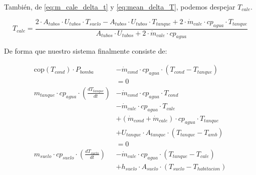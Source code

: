 También, de \eqref{eq:m_cale_delta_t} y \eqref{eq:mean_delta_T}, podemos despejar $T_{cale}$.

\begin{equation} \label{eq:t_cale}
	T_{cale} = \frac{2 \cdot A_{tubos} \cdot U_{tubos} \cdot T_{suelo} - A_{tubos} \cdot U_{tubos} \cdot T_{tanque} + 2 \cdot \dot{m}_{cale} \cdot cp_{agua} \cdot T_{tanque}}{A_{tubos} \cdot U_{tubos} + 2 \cdot \dot{m}_{cale} \cdot cp_{agua}}
\end{equation}

De forma que nuestro sistema finalmente consiste de:

\begin{align}
	\text{cop}(T_{cond}) \cdot P_{bomba}                                     & - \dot{m}_{cond} \cdot cp_{agua} \cdot \left(T_{cond} - T_{tanque}\right) \nonumber                  \\
	                                                                         & = 0 \label{eq:sys_1}                                                                                 \\
	m_{tanque} \cdot cp_{agua} \cdot \left( \frac{dT_{tanque}}{dt} \right)   & - \dot{m}_{cond} \cdot cp_{agua} \cdot T_{cond} \nonumber                                            \\
	                                                                         & - \dot{m}_{cale} \cdot cp_{agua} \cdot T_{cale} \nonumber                                            \\
	                                                                         & + (\dot{m}_{cond} + \dot{m}_{cale}) \cdot cp_{agua} \cdot T_{tanque} \nonumber                       \\
	                                                                         & + U_{tanque} \cdot A_{tanque} \cdot (T_{tanque} - T_{amb}) \nonumber                                 \\
	                                                                         & = 0 \label{eq:sys_2}                                                                                 \\
	m_{suelo} \cdot cp_{suelo} \cdot \left( \frac{dT_{suelo}}{dt} \right)    & - \dot{m}_{cale} \cdot cp_{agua} \cdot (T_{tanque} - T_{cale})                             \nonumber \\
	                                                                         & + h_{suelo} \cdot A_{suelo} \cdot (T_{suelo} - T_{habitacion})                             \nonumber \\

\end{align}
